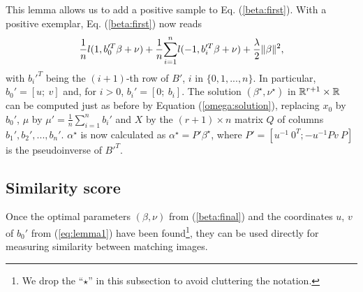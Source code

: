 This lemma allows us to add a positive sample to Eq. (\ref{beta:first}).
With a positive exemplar, Eq. (\ref{beta:first}) now reads
\begin{align}
 \dfrac{1}{n}l(1, b_0'^T\beta+\nu) +\dfrac{1}{n}\displaystyle{\sum_{i=1}^n} l(-1,b_i'^T\beta+\nu)
+\dfrac{\lambda}{2}\|\beta\|^2,\label{beta:final}
\end{align}
with $b_i'^T$ being the $(i+1)$-th row of $B'$, $i$ in $\{0,1,...,n\}$. In particular, $b_0'=[u; \ v]$ and, for $i>0$, $b_i'=[0; \ b_i]$. The solution $(\beta^\star,\nu^\star)$ in $\mathbb R^{r+1}\times\mathbb R$ can be computed just as before by Equation (\ref{omega:solution}), replacing $x_0$ by $b_0'$, $\mu$ by $\mu' = \frac{1}{n}\sum_{i=1}^n b_i'$ and $X$ by the $(r+1)\times n$ matrix $Q$ of columns $b_1', b_2',...,b_n'$. $\alpha^\star$ is now calculated as
$\alpha^\star=P'\beta^\star$, where $P' = [u^{-1} \ 0^T; -u^{-1}Pv \ P]$ is the pseudoinverse of $B'^T$. 


\subsection{Similarity score}\label{simi_score}
Once the optimal parameters $(\beta, \nu)$ from (\ref{beta:final}) and the coordinates $u$, $v$ of $b_0'$ from (\ref{eq:lemma1}) have been found\footnote{We drop the ``$\star$'' in this subsection to avoid cluttering the notation.}, they can be used directly for measuring similarity between matching images.


